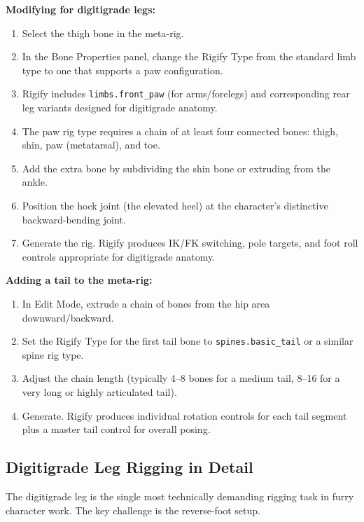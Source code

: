 \textbf{Modifying for digitigrade legs:}

\begin{enumerate}[leftmargin=2em]
  \item Select the thigh bone in the meta-rig.
  \item In the Bone Properties panel, change the Rigify Type from the standard limb type to one that supports a paw configuration.
  \item Rigify includes \texttt{limbs.front\_paw} (for arms/forelegs) and corresponding rear leg variants designed for digitigrade anatomy.
  \item The paw rig type requires a chain of at least four connected bones: thigh, shin, paw (metatarsal), and toe.
  \item Add the extra bone by subdividing the shin bone or extruding from the ankle.
  \item Position the hock joint (the elevated heel) at the character's distinctive backward-bending joint.
  \item Generate the rig. Rigify produces IK/FK switching, pole targets, and foot roll controls appropriate for digitigrade anatomy.
\end{enumerate}

\textbf{Adding a tail to the meta-rig:}

\begin{enumerate}[leftmargin=2em]
  \item In Edit Mode, extrude a chain of bones from the hip area downward/backward.
  \item Set the Rigify Type for the first tail bone to \texttt{spines.basic\_tail} or a similar spine rig type.
  \item Adjust the chain length (typically 4--8 bones for a medium tail, 8--16 for a very long or highly articulated tail).
  \item Generate. Rigify produces individual rotation controls for each tail segment plus a master tail control for overall posing.
\end{enumerate}


\subsection{Digitigrade Leg Rigging in Detail}
\label{subsec:digi-legs}

The digitigrade leg is the single most technically demanding rigging task in furry character work. The key challenge is the reverse-foot setup.

